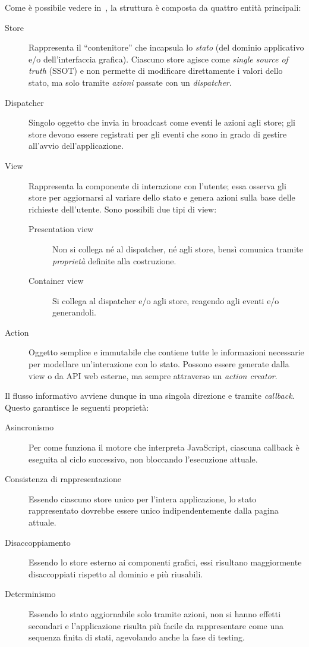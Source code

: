 Come è possibile vedere in~, la struttura è composta da quattro entità principali:
\begin{description}
  \item[Store]
    Rappresenta il ``contenitore'' che incapsula lo \emph{stato} (del dominio applicativo e/o dell'interfaccia grafica).
    Ciascuno store agisce come \emph{single source of truth} (SSOT)
    e non permette di modificare direttamente i valori dello stato, ma solo tramite \emph{azioni} passate con un \emph{dispatcher}.
  \item[Dispatcher]
    Singolo oggetto che invia in broadcast come eventi le azioni agli store;
    gli store devono essere registrati per gli eventi che sono in grado di gestire all'avvio dell'applicazione.
  \item[View]
    Rappresenta la componente di interazione con l'utente;
    essa osserva gli store per aggiornarsi al variare dello stato e genera azioni sulla base delle richieste dell'utente.
    Sono possibili due tipi di view:
    \begin{description}
      \item[Presentation view] Non si collega né al dispatcher, né agli store, bensì comunica tramite \emph{proprietà} definite alla costruzione.
      \item[Container view] Si collega al dispatcher e/o agli store, reagendo agli eventi e/o generandoli.
    \end{description}
  \item[Action]
    Oggetto semplice e immutabile che contiene tutte le informazioni necessarie per modellare un'interazione con lo stato.
    Possono essere generate dalla view o da API web esterne, ma sempre attraverso un \emph{action creator}.
\end{description}

Il flusso informativo avviene dunque in una singola direzione e tramite \emph{callback}.
Questo garantisce le seguenti proprietà:

\begin{description}
  \item[Asincronismo]
    Per come funziona il motore che interpreta JavaScript, ciascuna callback è eseguita al ciclo successivo, non bloccando l'esecuzione attuale.
  \item[Consistenza di rappresentazione]
    Essendo ciascuno store unico per l'intera applicazione, lo stato rappresentato dovrebbe essere unico indipendentemente dalla pagina attuale.
  \item[Disaccoppiamento]
    Essendo lo store esterno ai componenti grafici, essi risultano maggiormente disaccoppiati rispetto al dominio e più riusabili.
  \item[Determinismo]
    Essendo lo stato aggiornabile solo tramite azioni, non si hanno effetti secondari e l'applicazione risulta più facile da rappresentare come una sequenza finita di stati, agevolando anche la fase di testing.
\end{description}

